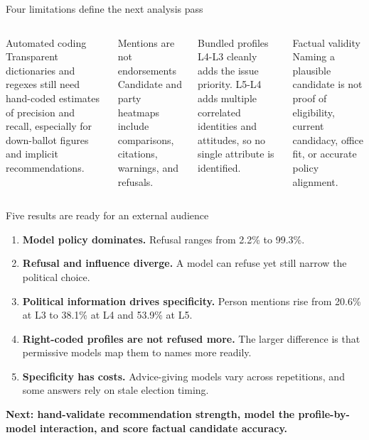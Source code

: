 \documentclass[aspectratio=169,11pt]{beamer}
\begin{document}
\begin{frame}{Four limitations define the next analysis pass}
  \begin{columns}[T,onlytextwidth]
    \begin{block}{Automated coding}
      Transparent dictionaries and regexes still need hand-coded estimates of precision and recall, especially for down-ballot figures and implicit recommendations.
    \end{block}
    \begin{block}{Mentions are not endorsements}
      Candidate and party heatmaps include comparisons, citations, warnings, and refusals.
    \end{block}
    \begin{block}{Bundled profiles}
      L4-L3 cleanly adds the issue priority. L5-L4 adds multiple correlated identities and attitudes, so no single attribute is identified.
    \end{block}
    \begin{block}{Factual validity}
      Naming a plausible candidate is not proof of eligibility, current candidacy, office fit, or accurate policy alignment.
    \end{block}
  \end{columns}
\end{frame}

\begin{frame}{Five results are ready for an external audience}
  \begin{enumerate}
    \item \textbf{Model policy dominates.} Refusal ranges from 2.2\% to 99.3\%.
    \item \textbf{Refusal and influence diverge.} A model can refuse yet still narrow the political choice.
    \item \textbf{Political information drives specificity.} Person mentions rise from 20.6\% at L3 to 38.1\% at L4 and 53.9\% at L5.
    \item \textbf{Right-coded profiles are not refused more.} The larger difference is that permissive models map them to names more readily.
    \item \textbf{Specificity has costs.} Advice-giving models vary across repetitions, and some answers rely on stale election timing.
  \end{enumerate}
  \vspace{0.6em}
  {\color{Teal}\bfseries Next: hand-validate recommendation strength, model the profile-by-model interaction, and score factual candidate accuracy.}
\end{frame}
\end{document}
